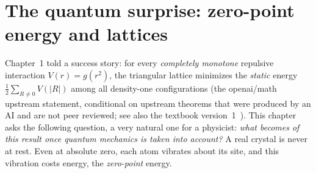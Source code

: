 
\chapter{The quantum surprise: zero-point energy and lattices}\label{ch3:chap}\label{ch3:debut}

\noindent Chapter~1 told a success story: for every \emph{completely monotone} repulsive interaction
$V(r)=g(r^2)$, the triangular lattice minimizes the \emph{static} energy $\tfrac12\sum_{R\neq0}V(|R|)$ among all
density-one configurations (the openai/math upstream statement, \tierA{} conditional on upstream theorems that were
produced by an AI and are not peer reviewed; see also the textbook version~1~\cite{v1}). This chapter asks the following question, a very natural one for a physicist: \emph{what
becomes of this result once quantum mechanics is taken into account?} A real crystal is never at rest. Even at
absolute zero, each atom vibrates about its site, and this vibration costs energy, the \emph{zero-point} energy.

